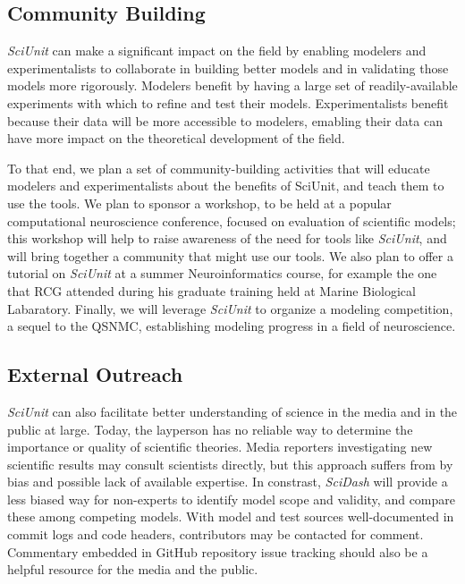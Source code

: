 \documentclass[11pt,letterpaper]{article}
\begin{document}
\subsection{Community Building}

\textit{SciUnit} can make a significant impact on the field by enabling modelers and experimentalists to collaborate in building better models and in validating those models more rigorously.  Modelers benefit by having a large set of readily-available experiments with which to refine and test their models.  Experimentalists benefit because their data will be more accessible to modelers, emabling their data can have more impact on the theoretical development of the field.

To that end, we plan a set of community-building activities that will educate modelers and experimentalists about the benefits of SciUnit, and teach them to use the tools.  We plan to sponsor a workshop, to be held at a popular computational neuroscience conference, focused on evaluation of scientific models; this workshop will help to raise awareness of the need for tools like \textit{SciUnit}, and will bring together a community that might use our tools.  We also plan to offer a tutorial on \textit{SciUnit} at a summer Neuroinformatics course, for example the one that RCG attended during his graduate training held at Marine Biological Labaratory.  Finally, we will leverage \textit{SciUnit} to organize a modeling competition, a sequel to the QSNMC\cite{jolivet_quantitative_2008}, establishing modeling progress in a field of neuroscience.

\subsection{External Outreach}
\textit{SciUnit} can also facilitate better understanding of science in the media and in the public at large.
Today, the layperson has no reliable way to determine the importance or quality of scientific theories.
Media reporters investigating new scientific results may consult scientists directly, but this approach suffers from by bias and possible lack of available expertise.
In constrast, \textit{SciDash} will provide a less biased way for non-experts to identify model scope and validity, and compare these among competing models.
With model and test sources well-documented in commit logs and code headers, contributors may be contacted for comment.
Commentary embedded in GitHub repository issue tracking should also be a helpful resource for the media and the public.  
\end{document}
